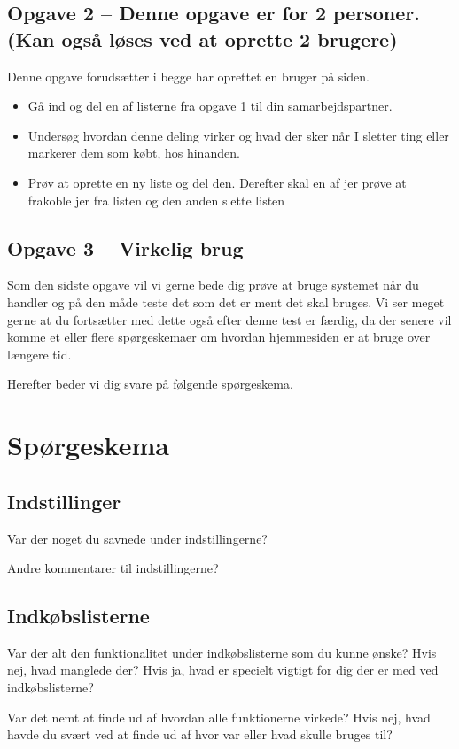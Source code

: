\subsection*{Opgave 2 – Denne opgave er for 2 personer. (Kan også løses ved at oprette 2 brugere)}
Denne opgave forudsætter i begge har oprettet en bruger på siden.
\begin{itemize}
\item Gå ind og del en af listerne fra opgave 1 til din samarbejdspartner. 
\item Undersøg hvordan denne deling virker og hvad der sker når I sletter ting eller markerer dem som købt, hos hinanden. 
\item Prøv at oprette en ny liste og del den. Derefter skal en af jer prøve at frakoble jer fra listen og den anden slette listen
\end{itemize}
\subsection*{Opgave 3 – Virkelig brug}
Som den sidste opgave vil vi gerne bede dig prøve at bruge systemet når du handler og på den måde teste det som det er ment det skal bruges. Vi ser meget gerne at du fortsætter med dette også efter denne test er færdig, da der senere vil komme et eller flere spørgeskemaer om hvordan hjemmesiden er at bruge over længere tid.

Herefter beder vi dig svare på følgende spørgeskema.

\section*{Spørgeskema}
\subsection*{Indstillinger}
Var der noget du savnede under indstillingerne?


Andre kommentarer til indstillingerne?

\subsection*{Indkøbslisterne}
Var der alt den funktionalitet under indkøbslisterne som du kunne ønske? Hvis nej, hvad manglede der? Hvis ja, hvad er specielt vigtigt for dig der er med ved indkøbslisterne?

Var det nemt at finde ud af hvordan alle funktionerne virkede? Hvis nej, hvad havde du svært ved at finde ud af hvor var eller hvad skulle bruges til?



